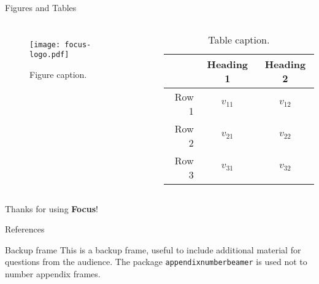\documentclass{beamer}
\begin{document}
    \begin{frame}{Figures and Tables}
        \begin{columns}
                \begin{figure}
                    \centering
                    \texttt{[image: focus-logo.pdf]}
                    \caption{Figure caption.}
                    \label{fig:focuslogo}
                \end{figure}
                
                \begin{table}
                    \centering
                    \begin{tabular}{rcc}
                         & Heading 1 & Heading 2 \\\hline
                        Row 1 & \(v_{11}\) & \(v_{12}\) \\
                        Row 2 & \(v_{21}\) & \(v_{22}\) \\
                        Row 3 & \(v_{31}\) & \(v_{32}\) \\
                    \end{tabular}
                    \caption{Table caption.}
                    \label{tab:demo}
                \end{table}
        \end{columns}
    \end{frame}
    
    \begin{frame}[focus]
        Thanks for using \textbf{Focus}!
    \end{frame}
    
    \appendix
    \begin{frame}{References}
        \nocite{*}
        
        
    \end{frame}
    
    \begin{frame}{Backup frame}
        This is a backup frame, useful to include additional material for questions from the audience.
        \vfill
        The package \texttt{appendixnumberbeamer} is used not to number appendix frames.
    \end{frame}
\end{document}
